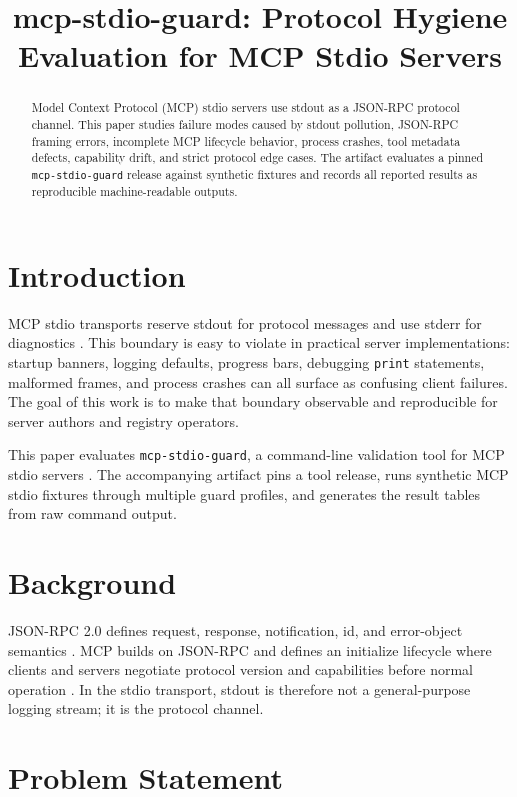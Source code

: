\documentclass[10pt]{article}
\title{mcp-stdio-guard: Protocol Hygiene Evaluation for MCP Stdio Servers}
\author{}
\date{}
\begin{document}
\maketitle

\begin{abstract}
Model Context Protocol (MCP) stdio servers use stdout as a JSON-RPC protocol
channel. This paper studies failure modes caused by stdout pollution,
JSON-RPC framing errors, incomplete MCP lifecycle behavior, process crashes,
tool metadata defects, capability drift, and strict protocol edge cases. The
artifact evaluates a pinned \texttt{mcp-stdio-guard} release against synthetic
fixtures and records all reported results as reproducible machine-readable
outputs.
\end{abstract}

\section{Introduction}

MCP stdio transports reserve stdout for protocol messages and use stderr for
diagnostics \cite{mcpstdio}. This boundary is easy to violate in practical
server implementations: startup banners, logging defaults, progress bars,
debugging \texttt{print} statements, malformed frames, and process crashes can
all surface as confusing client failures. The goal of this work is to make that
boundary observable and reproducible for server authors and registry operators.

This paper evaluates \texttt{mcp-stdio-guard}, a command-line validation tool
for MCP stdio servers \cite{mcpstdioguard}. The accompanying artifact pins a
tool release, runs synthetic MCP stdio fixtures through multiple guard profiles,
and generates the result tables from raw command output.

\section{Background}

JSON-RPC 2.0 defines request, response, notification, id, and error-object
semantics \cite{jsonrpc20}. MCP builds on JSON-RPC and defines an initialize
lifecycle where clients and servers negotiate protocol version and capabilities
before normal operation \cite{mcplifecycle}. In the stdio transport, stdout is
therefore not a general-purpose logging stream; it is the protocol channel.

\section{Problem Statement}
\end{document}
